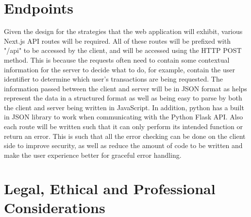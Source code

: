 \section{Endpoints}
Given the design for the strategies that the web application will exhibit, various Next.js API routes will be required. All of these routes will be prefixed with "/api" to be accessed by the client, and will be accessed using the HTTP POST method. This is because the requests often need to contain some contextual information for the server to decide what to do, for example, contain the user identifier to determine which user's transactions are being requested. The information passed between the client and server will be in JSON format as helps represent the data in a structured format as well as being easy to parse by both the client and server being written in JavaScript. In addition, python has a built in JSON library to work when communicating with the Python Flask API. Also each route will be written such that it can only perform its intended function or return an error. This is such that all the error checking can be done on the client side to improve security, as well as reduce the amount of code to be written and make the user experience better for graceful error handling.

\section{Legal, Ethical and Professional Considerations}




